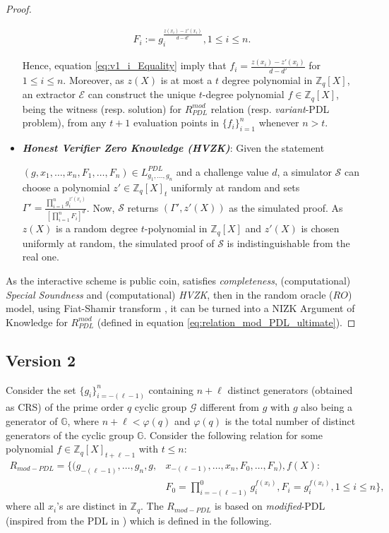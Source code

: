 \begin{proof}
\begin{itemize}
      \begin{align}\label{eq:v1_i_Equality}
        F_i := g_i^{\frac{z(x_i)-z'(x_i)}{d-d'}}, 1\leq i\leq n.
      \end{align}

      Hence, equation \ref{eq:v1_i_Equality} imply that $f_i=\frac{z(x_i)-z'(x_i)}{d-d'}$ for 
      $1\leq i\leq n$. Moreover, as $z(X)$ is at most a $t$ degree 
      polynomial in $\mathbb{Z}_q[X]$, an extractor $\mathcal{E}$ can construct the unique $t$-degree 
      polynomial $f\in\mathbb{Z}_q[X]$, being the witness (resp. solution) for $R_{PDL}^{mod}$ relation (resp. \textit{variant}-PDL problem), 
      from any $t+1$ evaluation points in $\{f_i\}_{i=1}^n$ whenever $n>t$.
    \item \textit{\textbf{Honest Verifier Zero Knowledge (HVZK)}}: Given the statement\par $(g,x_1,\dots,x_n,F_1,\dots,F_n)\in L_{g_1,\dots,g_n}^{PDL}$  
      and a challenge value $d$, a simulator $\mathcal{S}$ can choose a polynomial $z'\in\mathbb{Z}_q[X]_{t}$ uniformly 
      at random and sets $\Gamma'=\frac{\prod_{i=1}^{n}g_i^{z'(x_i)}}{[\prod_{i=1}^{n}F_i]^d}$. 
      Now, $\mathcal{S}$ returns $(\Gamma',z'(X))$ as the simulated proof. As $z(X)$ is a random 
      degree $t$-polynomial in $\mathbb{Z}_q[X]$ and $z'(X)$ is chosen uniformly at random, 
      the simulated proof of $\mathcal{S}$ is indistinguishable from the real one.
  \end{itemize}
  As the interactive scheme is public coin, satisfies \textit{completeness}, (computational) \textit{Special Soundness} 
  and (computational) \textit{HVZK}, then in the random oracle ($RO$) model, using Fiat-Shamir transform \cite{10.1007/3-540-47721-7_12}, 
  it can be turned into a NIZK Argument of Knowledge for $R_{PDL}^{mod}$ (defined in equation \ref{eq:relation_mod_PDL_ultimate}).
\end{proof}

\subsection{Version 2}
\label{subsec:AoK_mod_pdl}
Consider the set $\{g_i\}_{i=-(\ell-1)}^n$ containing $n+\ell$ distinct generators (obtained as CRS) of 
the prime order $q$ cyclic group $\mathcal{G}$ different from $g$ with $g$ also being a generator of 
$\mathbb{G}$, where $n+\ell<\varphi(q)$ and $\varphi(q)$ is
the total number of distinct generators of the cyclic group $\mathbb{G}$. Consider the following relation for 
some polynomial $f\in\mathbb{Z}_q[X]_{t+\ell-1}$ with $t\leq n$:
\begin{align}\label{eq:new_mod_PDL}
  R_{mod-PDL} = \{(g_{-(\ell-1)},\dots,g_n,g,&x_{-(\ell-1)},\dots,x_n,F_0,\dots,F_n),f(X) :\nonumber\\
   &F_0=\prod_{i=-(\ell-1)}^{0}g_i^{f(x_i)}, F_i=g_i^{f(x_i)}, 1\leq i\leq n\},
\end{align}
where all $x_i$'s are distinct in $\mathbb{Z}_q$. The $R_{mod-PDL}$ is based on \textit{modified}-PDL 
(inspired from the PDL in \cite{cryptoeprint:2023/1669}) which is defined in the following.

